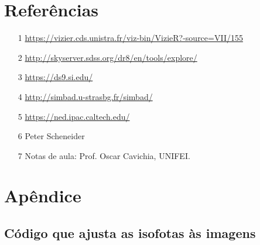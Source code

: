 \documentclass[a4paper, 11pt, fleqn, leqno]{article}
\begin{document}
\section{Referências}

\begin{itemize}
	\item [1] \url{https://vizier.cds.unistra.fr/viz-bin/VizieR?-source=VII/155}
	\item [2] \url{http://skyserver.sdss.org/dr8/en/tools/explore/}
	\item [3] \url{https://ds9.si.edu/}
	\item [4] \url{http://simbad.u-strasbg.fr/simbad/}
	\item [5] \url{https://ned.ipac.caltech.edu/}
	\item [6] Peter Scheneider
	\item [7] Notas de aula: Prof. Oscar Cavichia, UNIFEI.
\end{itemize}

\newpage
\section{Apêndice}

\subsection{Código que ajusta as isofotas às imagens}
\end{document}
